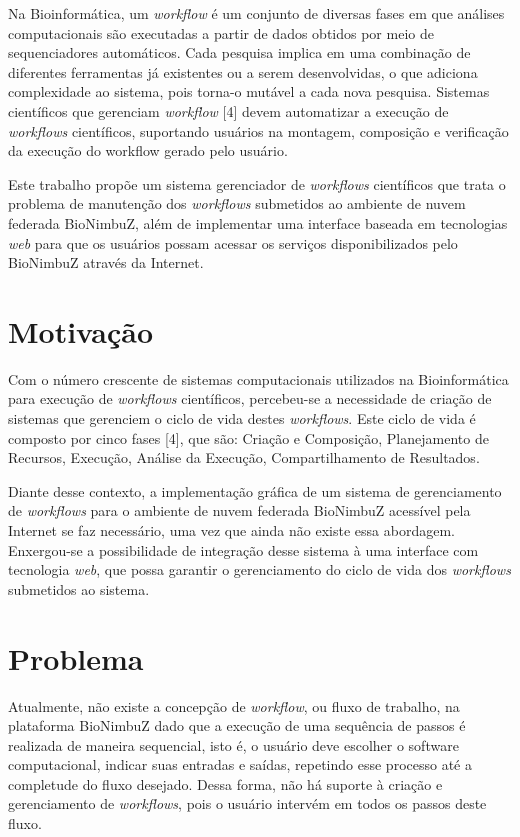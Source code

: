 Na Bioinformática, um \textit{workflow} é um conjunto de diversas fases em que análises computacionais são executadas a partir de dados obtidos por meio de sequenciadores automáticos. Cada pesquisa implica em uma combinação de diferentes ferramentas já existentes ou a serem desenvolvidas, o que adiciona complexidade ao sistema, pois torna-o mutável a cada nova pesquisa. Sistemas científicos que gerenciam \textit{workflow} [4] devem automatizar a execução de \textit{workflows} científicos, suportando usuários na montagem, composição e verificação da execução do workflow gerado pelo usuário.

Este trabalho propõe um sistema gerenciador de \textit{workflows} científicos que trata o problema de manutenção dos \textit{workflows} submetidos ao ambiente de nuvem federada BioNimbuZ, além de implementar uma interface baseada em tecnologias \textit{web} para que os usuários possam acessar os serviços disponibilizados pelo BioNimbuZ através da Internet.

\section{Motivação} \label{cap1sec1}

Com o número crescente de sistemas computacionais utilizados na Bioinformática para execução de \textit{workflows} científicos, percebeu-se a necessidade de criação de sistemas que gerenciem o ciclo de vida destes \textit{workflows}. Este ciclo de vida é composto por cinco fases [4], que são: Criação e Composição, Planejamento de Recursos, Execução, Análise da Execução, Compartilhamento de Resultados. 

Diante desse contexto, a implementação gráfica de um sistema de gerenciamento de \textit{workflows} para o ambiente de nuvem federada BioNimbuZ acessível pela Internet se faz necessário, uma vez que ainda não existe essa abordagem. Enxergou-se a possibilidade de integração desse sistema à uma interface com tecnologia \textit{web}, que possa garantir o gerenciamento do ciclo de vida dos \textit{workflows} submetidos ao sistema. 

\section{Problema} \label{cap1sec2}

Atualmente, não existe a concepção de \textit {workflow}, ou fluxo de trabalho, na plataforma BioNimbuZ dado que a execução de uma sequência de passos é realizada de maneira sequencial, isto é, o usuário deve escolher o software computacional, indicar suas entradas e saídas, repetindo esse processo até a completude do fluxo desejado. Dessa forma, não há suporte à criação e gerenciamento de \textit{workflows}, pois o usuário intervém em todos os passos deste fluxo. 
	
